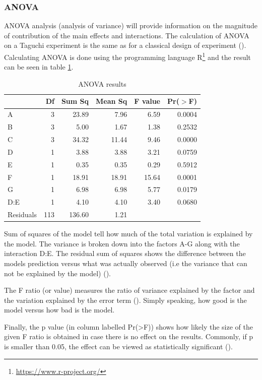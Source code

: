 \subsubsection{ANOVA}
ANOVA analysis (analysis of variance) will provide information on the magnitude of contribution of the main effects and interactions. The calculation of ANOVA on a Taguchi experiment is the same as for a classical design of experiment (\cite{yang_design_2009}). Calculating ANOVA is done using the programming language R\footnote{\href{https://www.r-project.org/}{https://www.r-project.org/}} and the result can be seen in table \ref{table:taguchi:anova_results}.

\begin{table}[ht]
	\centering
	\begin{tabular}{lrrrrr}
		\hline
		& Df & Sum Sq & Mean Sq & F value & Pr($>$F) \\ 
		\hline
		A & 3 & 23.89 & 7.96 & 6.59 & 0.0004 \\ 
		B & 3 & 5.00 & 1.67 & 1.38 & 0.2532 \\ 
		C & 3 & 34.32 & 11.44 & 9.46 & 0.0000 \\ 
		D & 1 & 3.88 & 3.88 & 3.21 & 0.0759 \\ 
		E & 1 & 0.35 & 0.35 & 0.29 & 0.5912 \\ 
		F & 1 & 18.91 & 18.91 & 15.64 & 0.0001 \\ 
		G & 1 & 6.98 & 6.98 & 5.77 & 0.0179 \\ 
		D:E & 1 & 4.10 & 4.10 & 3.40 & 0.0680 \\ 
		Residuals & 113 & 136.60 & 1.21 &  &  \\ 
		\hline
	\end{tabular}
	\caption{ANOVA results}
	\label{table:taguchi:anova_results}
\end{table}

Sum of squares of the model tell how much of the total variation is explained by the model. The variance is broken down into the factors A-G along with the interaction D:E. The residual sum of squares shows the difference between the models prediction versus what was actually observed (i.e the variance that can not be explained by the model) (\cite{field_discovering_2012}).

The F ratio (or value) measures the ratio of variance explained by the factor and the variation explained by the error term (\cite{field_discovering_2012}). Simply speaking, how good is the model versus how bad is the model. 

Finally, the p value (in column labelled Pr(>F)) shows how likely the size of the given F ratio is obtained in case there is no effect on the results. Commonly, if p is smaller than 0.05, the effect can be viewed as statistically significant (\cite{field_discovering_2012}).

